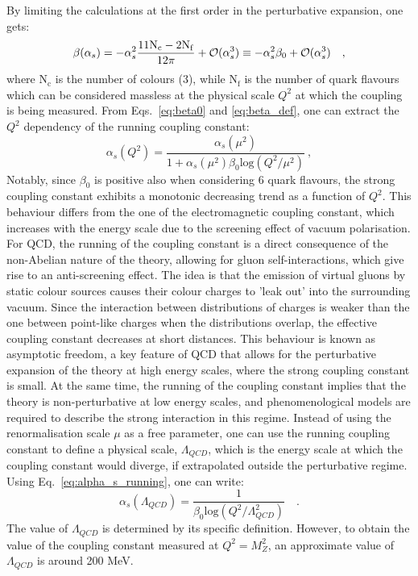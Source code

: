 By limiting the calculations at the first order in the perturbative expansion, one gets:
\begin{equation}\label{eq:beta0}
    \beta(\alpha_s) = -\alpha_s^2 \frac{11 \mathrm{N_c} - 2 \mathrm{N_f}}{12\pi} + \mathcal{O}(\alpha_s^3) \equiv -\alpha_s^2 \beta_0 + \mathcal{O}(\alpha_s^3)\quad ,
\end{equation}
where $\mathrm{N_c}$ is the number of colours (3), while $\mathrm{N_f}$ is the number of quark flavours which can be considered massless at the physical scale $Q^2$ at which the coupling is being measured.
From Eqs.~\ref{eq:beta0} and \ref{eq:beta_def}, one can extract the $Q^2$ dependency of the running coupling constant:
\begin{equation}\label{eq:alpha_s_running}
    \alpha_s(Q^2) = \frac{\alpha_s(\mu^2)}{1+\alpha_s(\mu^2)\beta_0 \mathrm{log}(Q^2/\mu^2)}\ ,
\end{equation}
Notably, since $\beta_0$ is positive also when considering 6 quark flavours, the strong coupling constant exhibits a monotonic decreasing trend as a function of $Q^2$. This behaviour differs from the one of the electromagnetic coupling constant, which increases with the energy scale due to the screening effect of vacuum polarisation. For QCD, the running of the coupling constant is a direct consequence of the non-Abelian nature of the theory, allowing for gluon self-interactions, which give rise to an anti-screening effect. The idea is that the emission of virtual gluons by static colour sources causes their colour charges to 'leak out' into the surrounding vacuum. Since the interaction between distributions of charges is weaker than the one between point-like charges when the distributions overlap, the effective coupling constant decreases at short distances. This behaviour is known as asymptotic freedom, a key feature of QCD that allows for the perturbative expansion of the theory at high energy scales, where the strong coupling constant is small. At the same time, the running of the coupling constant implies that the theory is non-perturbative at low energy scales, and phenomenological models are required to describe the strong interaction in this regime. Instead of using the renormalisation scale $\mu$ as a free parameter, one can use the running coupling constant to define a physical scale, $\Lambda_{QCD}$, which is the energy scale at which the coupling constant would diverge, if extrapolated outside the perturbative regime. Using Eq.~\ref{eq:alpha_s_running}, one can write:
\begin{equation*}
    \alpha_s(\Lambda_{QCD}) = \frac{1}{\beta_0 \mathrm{log}(Q^2/\Lambda_{QCD}^2)}\quad .
\end{equation*}
The value of $\Lambda_{QCD}$ is determined by its specific definition. However, to obtain the value of the coupling constant measured at $Q^2 = M_Z^2$, an approximate value of $\Lambda_{QCD}$ is around 200 MeV.

